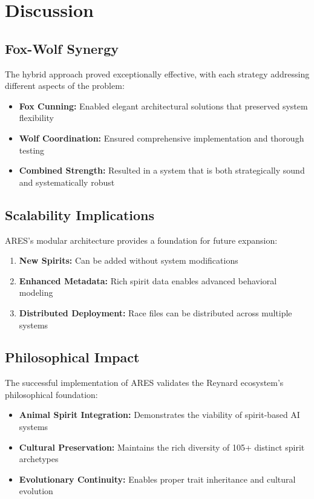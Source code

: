 \documentclass[11pt,a4paper]{article}
\begin{document}
\section{Discussion}

\subsection{Fox-Wolf Synergy}

The hybrid approach proved exceptionally effective, with each strategy addressing different aspects of the problem:

\begin{itemize}
    \item \textbf{Fox Cunning:} Enabled elegant architectural solutions that preserved system flexibility
    \item \textbf{Wolf Coordination:} Ensured comprehensive implementation and thorough testing
    \item \textbf{Combined Strength:} Resulted in a system that is both strategically sound and systematically robust
\end{itemize}

\subsection{Scalability Implications}

ARES's modular architecture provides a foundation for future expansion:

\begin{enumerate}
    \item \textbf{New Spirits:} Can be added without system modifications
    \item \textbf{Enhanced Metadata:} Rich spirit data enables advanced behavioral modeling
    \item \textbf{Distributed Deployment:} Race files can be distributed across multiple systems
\end{enumerate}

\subsection{Philosophical Impact}

The successful implementation of ARES validates the Reynard ecosystem's philosophical foundation:

\begin{itemize}
    \item \textbf{Animal Spirit Integration:} Demonstrates the viability of spirit-based AI systems
    \item \textbf{Cultural Preservation:} Maintains the rich diversity of 105+ distinct spirit archetypes
    \item \textbf{Evolutionary Continuity:} Enables proper trait inheritance and cultural evolution
\end{itemize}
\end{document}
